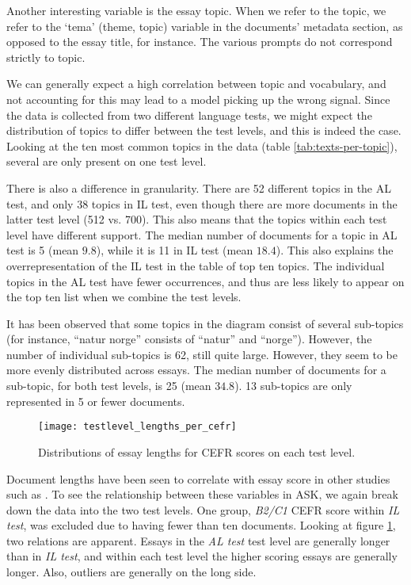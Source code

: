 Another interesting variable is the essay topic. When we refer to the topic,
we refer to the `tema' (theme, topic) variable in the documents' metadata
section, as opposed to the essay title, for instance. The various prompts do
not correspond strictly to topic.

We can generally expect a high correlation between topic and vocabulary, and
not accounting for this may lead to a model picking up the wrong signal.
Since the data is collected from two different language tests, we might
expect the distribution of topics to differ between the test levels, and this
is indeed the case. Looking at the ten most common topics in the data (table
\ref{tab:texts-per-topic}), several are only present on one test level.

There is also a difference in granularity. There are 52 different topics in
the AL test, and only 38 topics in IL test, even though there are more
documents in the latter test level (512 vs. 700). This also means that the
topics within each test level have different support. The median number of
documents for a topic in AL test is 5 (mean $9.8$), while it is 11 in IL test
(mean $18.4$). This also explains the overrepresentation of the IL test in
the table of top ten topics. The individual topics in the AL test have fewer
occurrences, and thus are less likely to appear on the top ten list when we
combine the test levels.

It has been observed that some topics in the diagram consist of several
sub-topics (for instance, ``natur norge'' consists of ``natur'' and
``norge''). However, the number of individual sub-topics is 62, still quite
large. However, they seem to be more evenly distributed across essays. The
median number of documents for a sub-topic, for both test levels, is 25 (mean
$34.8$). 13 sub-topics are only represented in 5 or fewer documents.

\begin{figure}
  \centering
  \texttt{[image: testlevel\_lengths\_per\_cefr]}
  \caption[Document lengths on each CEFR level]{
    Distributions of essay lengths for CEFR scores on each test level.
  }
  \label{fig:testlevel-lengths-per-cefr}
\end{figure}

Document lengths have been seen to correlate with essay score in other
studies such as \textcite{vajjala17}. To see the relationship between these
variables in ASK, we again break down the data into the two test levels. One
group, \emph{B2/C1} CEFR score within \emph{IL test}, was excluded due to
having fewer than ten documents. Looking at figure
\ref{fig:testlevel-lengths-per-cefr}, two relations are apparent. Essays in
the \emph{AL test} test level are generally longer than in \emph{IL test},
and within each test level the higher scoring essays are generally longer.
Also, outliers are generally on the long side.

